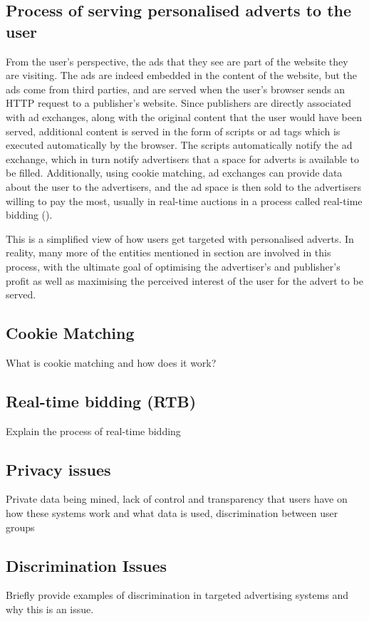 \documentclass{l4proj}
\begin{document}
\subsection{Process of serving personalised adverts to the user}
From the user's perspective, the ads that they see are part of the website they are visiting. The ads are indeed embedded in the content of the website, but the ads come from third parties, and are served when the user's browser sends an HTTP request to a publisher's website. Since publishers are directly associated with ad exchanges, along with the original content that the user would have been served, additional content is served in the form of scripts or ad tags which is executed automatically by the browser. The scripts automatically notify the ad exchange, which in turn notify advertisers that a space for adverts is available to be filled. Additionally, using cookie matching, ad exchanges can provide data about the user to the advertisers, and the ad space is then sold to the advertisers willing to pay the most, usually in real-time auctions in a process called real-time bidding (\cite{Estrada-Jimenez2017}).

This is a simplified view of how users get targeted with personalised adverts. In reality, many more of the entities mentioned in section  are involved in this process, with the ultimate goal of optimising the advertiser's and publisher's profit as well as maximising the perceived interest of the user for the advert to be served.

\subsection{Cookie Matching}
What is cookie matching and how does it work? 

\subsection{Real-time bidding (RTB)}
Explain the process of real-time bidding

\subsection{Privacy issues}
Private data being mined, lack of control and transparency that users have on how these systems work and what data is used, discrimination between user groups

\subsection{Discrimination Issues}
Briefly provide examples of discrimination in targeted advertising systems and why this is an issue. 
\end{document}
